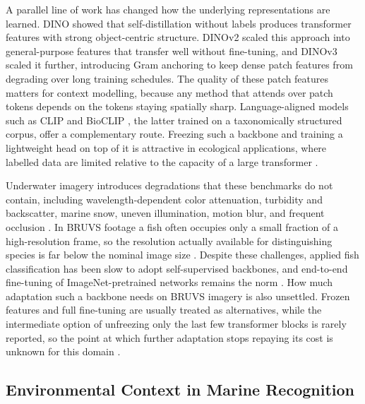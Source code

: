 \documentclass[preprint,12pt]{elsarticle}
\begin{document}
A parallel line of work has changed how the underlying representations
are learned. DINO \citep{ref46} showed that
self-distillation without labels produces transformer features with
strong object-centric structure. DINOv2
\citep{ref47} scaled this approach into
general-purpose features that transfer well without fine-tuning, and
DINOv3 \citep{ref25} scaled it further,
introducing Gram anchoring to keep dense patch features from degrading
over long training schedules. The quality of these patch features
matters for context modelling, because any method that attends over
patch tokens depends on the tokens staying spatially sharp.
Language-aligned models such as CLIP
\citep{ref48} and BioCLIP
\citep{ref49}, the latter trained on a
taxonomically structured corpus, offer a complementary route. Freezing
such a backbone and training a lightweight head on top of it is
attractive in ecological applications, where labelled data are limited
relative to the capacity of a large transformer
\citep{ref50,ref51}.

Underwater imagery introduces degradations that these benchmarks do not
contain, including wavelength-dependent color attenuation, turbidity and
backscatter, marine snow, uneven illumination, motion blur, and frequent
occlusion \citep{ref8,ref11,ref52}. In BRUVS footage a fish often
occupies only a small fraction of a high-resolution frame, so the
resolution actually available for distinguishing species is far below
the nominal image size \citep{ref4,ref9}. Despite these challenges, applied
fish classification has been slow to adopt self-supervised backbones,
and end-to-end fine-tuning of ImageNet-pretrained networks remains the
norm \citep{ref6,ref51}. How much adaptation such a
backbone needs on BRUVS imagery is also unsettled. Frozen features and
full fine-tuning are usually treated as alternatives, while the
intermediate option of unfreezing only the last few transformer blocks
is rarely reported, so the point at which further adaptation stops
repaying its cost is unknown for this domain
\citep{ref51}.

\subsection{Environmental Context in Marine
Recognition}\label{environmental-context-in-marine-recognition}
\end{document}
